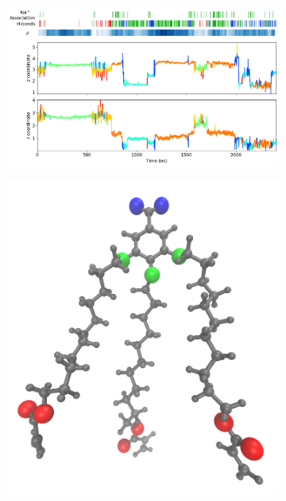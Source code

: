 \documentclass[journal=jpcbfk,manuscript=article]{achemso}
\begin{document}
  \begin{figure}
  \centering
  \begin{subfigure}{0.75\textwidth}
  \includegraphics[width=\textwidth]{mechanism_map.png}
  \caption{}
  \end{subfigure}
  \begin{subfigure}{0.24\textwidth}
  \includegraphics[width=\textwidth]{monomer_oxygens.png}
  \caption{}

\end{subfigure}
\end{figure}
\end{document}
